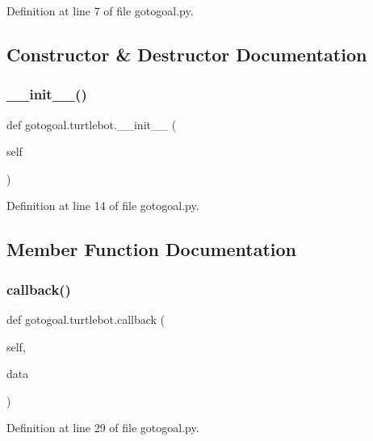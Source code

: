 Definition at line 7 of file gotogoal.\+py.



\subsection{Constructor \& Destructor Documentation}
\mbox{\label{classgotogoal_1_1turtlebot_a0c345bfb04a77eee5a248147b2c76729}} 
\subsubsection{\texorpdfstring{\+\_\+\+\_\+init\+\_\+\+\_\+()}{\_\_init\_\_()}}
{\footnotesize\ttfamily def gotogoal.\+turtlebot.\+\_\+\+\_\+init\+\_\+\+\_\+ (\begin{DoxyParamCaption}\item[{}]{self }\end{DoxyParamCaption})}



Definition at line 14 of file gotogoal.\+py.



\subsection{Member Function Documentation}
\mbox{\label{classgotogoal_1_1turtlebot_af658b74058b892540fc757e3c58bacaa}} 
\subsubsection{\texorpdfstring{callback()}{callback()}}
{\footnotesize\ttfamily def gotogoal.\+turtlebot.\+callback (\begin{DoxyParamCaption}\item[{}]{self,  }\item[{}]{data }\end{DoxyParamCaption})}



Definition at line 29 of file gotogoal.\+py.

